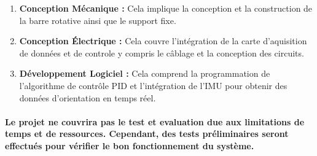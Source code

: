 \begin{enumerate}
	\item \textbf{Conception Mécanique :} Cela implique la conception et la construction de la barre rotative ainsi que le support fixe.
	\item \textbf{Conception Électrique :}  Cela couvre l'intégration de la carte d'aquisition de données et de controle y compris le câblage et la conception des circuits.
	\item \textbf{Développement Logiciel :} Cela comprend la programmation de l'algorithme de contrôle PID et l'intégration de l'IMU pour obtenir des données d'orientation en temps réel.
\end{enumerate}

\paragraph{Le projet ne couvrira pas le test et evaluation due aux limitations de temps et de ressources. Cependant, des tests préliminaires seront effectués pour vérifier le bon fonctionnement du système.}
